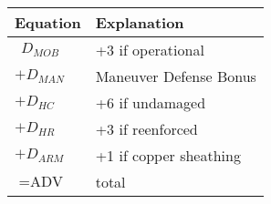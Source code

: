 \small
\begin{tabular}{@{} l l}
\textbf{Equation} & \textbf{Explanation}\\ 
\midrule
{\LARGE$\ \ D_{MOB}$} & +3 if operational\\
{\LARGE$+D_{MAN}$} & Maneuver Defense Bonus\\
{\LARGE$+D_{HC}$} & +6 if undamaged\\
{\LARGE$+D_{HR}$} & +3 if reenforced\\
{\LARGE$+D_{ARM}$} & +1 if copper sheathing\\
{\LARGE$=\text{ADV}$} & total
\end{tabular}